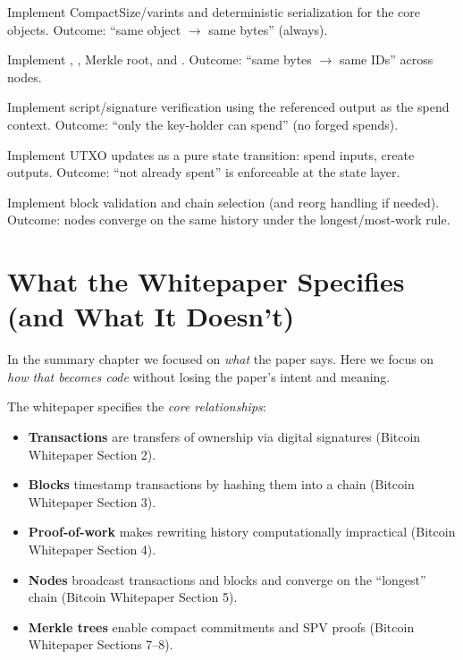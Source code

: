 \begin{steps}
 Implement CompactSize/varints and deterministic serialization for the core objects. Outcome: ``same object \(\to\) same bytes'' (always).

 Implement , , Merkle root, and . Outcome: ``same bytes \(\to\) same IDs'' across nodes.

 Implement script/signature verification using the referenced output as the spend context. Outcome: ``only the key-holder can spend'' (no forged spends).

 Implement UTXO updates as a pure state transition: spend inputs, create outputs. Outcome: ``not already spent'' is enforceable at the state layer.

 Implement block validation and chain selection (and reorg handling if needed). Outcome: nodes converge on the same history under the longest/most-work rule.
\end{steps}

\section{What the Whitepaper Specifies (and What It Doesn't)}
\label{sec:whitepaper-scope}

In the summary chapter we focused on \emph{what} the paper says. Here we focus on \emph{how that becomes code} without losing the paper's intent and meaning.

The whitepaper specifies the \emph{core relationships}:

\begin{itemize}
  \item \textbf{Transactions} are transfers of ownership via digital signatures (Bitcoin Whitepaper Section 2).
  \item \textbf{Blocks} timestamp transactions by hashing them into a chain (Bitcoin Whitepaper Section 3).
  \item \textbf{Proof-of-work} makes rewriting history computationally impractical (Bitcoin Whitepaper Section 4).
  \item \textbf{Nodes} broadcast transactions and blocks and converge on the ``longest'' chain (Bitcoin Whitepaper Section 5).
  \item \textbf{Merkle trees} enable compact commitments and SPV proofs (Bitcoin Whitepaper Sections 7--8).
\end{itemize}

